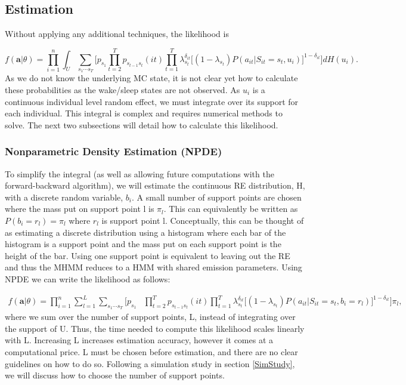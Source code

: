 \documentclass{article}
\begin{document}
\subsection{Estimation}

Without applying any additional techniques, the likelihood is 

\begin{equation*}
f(\textbf{a}|\theta) = \prod_{i=1}^n \int_U \sum_{{s_1}\cdots{s_T}} \biggr[ 
    p_{s_1} \prod_{t=2}^T p_{s_{t-1}s_t}(it) \prod_{t=1}^T \lambda_{s_t}^{\delta_{it}} \big[(1-\lambda_{s_t})P(a_{it}|S_{it}=s_t,u_i)\big]^{1-\delta_{it}}\biggr] dH(u_i).
\end{equation*}
As we do not know the underlying MC state, it is not clear yet how to calculate these probabilities as the wake/sleep states are not observed. As $u_i$ is a continuous individual level random effect, we must integrate over its support for each individual. This integral is complex and requires numerical methods to solve. The next two subsections will detail how to calculate this likelihood. 



\subsubsection{Nonparametric Density Estimation (NPDE)}

To simplify the integral (as well as allowing future computations with the forward-backward algorithm), we will estimate the continuous RE distribution, H, with a discrete random variable, $b_i$. A small number of support points are chosen where the mass put on support point l is $\pi_l$. This can equivalently be written as $P(b_i = r_l) = \pi_l$ where $r_l$ is support point l. Conceptually, this can be thought of as estimating a discrete distribution using a histogram where each bar of the histogram is a support point and the mass put on each support point is the height of the bar. Using one support point is equivalent to leaving out the RE and thus the MHMM reduces to a HMM with shared emission parameters. Using NPDE we can write the likelihood as follows: 

\begin{equation*}\label{like2}
    \begin{split}
f(\textbf{a}|\theta) = \prod_{i=1}^n \sum_{l=1}^L \sum_{{s_1}\cdots{s_T}} \biggr[ 
    p_{s_1} & \prod_{t=2}^T p_{s_{t-1}s_t}(it) 
    \prod_{t=1}^T \lambda_{s_t}^{\delta_{it}} \big[(1-\lambda_{s_t})P(a_{it}|S_{it}=s_t,b_i=r_l)\big]^{1-\delta_{it}} \biggr] \pi_l,
    \end{split}
\end{equation*}
where we sum over the number of support points, L, instead of integrating over the support of U. Thus, the time needed to compute this likelihood scales linearly with L. Increasing L increases estimation accuracy, however it comes at a computational price. L must be chosen before estimation, and there are no clear guidelines on how to do so. Following a simulation study in section \ref{SimStudy}, we will discuss how to choose the number of support points.
\end{document}
